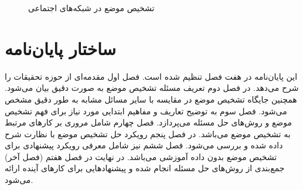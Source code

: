 \begin{figure}[H]
	\caption[تشخیص موضع در شبکه‌های اجتماعی]{تشخیص موضع در شبکه‌های اجتماعی
	\cite{10.1145/3369026}}
\end{figure}

\section{ساختار پایان‌نامه}
این پایان‌نامه در هفت فصل تنظیم شده است. فصل اول مقدمه‌ای از حوزه تحقیقات را شرح می‌دهد. در فصل دوم تعریف مسئله تشخیص موضع به صورت دقیق بیان می‌شود. همچنین جایگاه تشخیص موضع در مقایسه با سایر مسائل مشابه به طور دقیق مشخص می‌شود. فصل سوم به توضیح تعاریف و مفاهیم ابتدایی مورد نیاز برای فهم تشخیص موضع و روش‌های حل مسئله می‌پردازد.
فصل چهارم شامل مروری بر کارهای مرتبط به تشخیص موضع می‌باشد. در فصل پنجم رویکرد حل تشخیص موضع با نظارت شرح داده شده و بررسی می‌شود. فصل ششم نیز شامل معرفی رویکرد پیشنهادی برای تشخیص موضع بدون داده آموزشی می‌باشد. در نهایت در فصل هفتم (فصل آخر) جمع‌بندی از روش‌های حل مسئله انجام شده و پیشنهادهایی برای کارهای آینده ارائه می‌شود.





